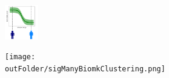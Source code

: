 \documentclass[8pt,xcolor=table]{beamer}
\begin{document}
\begin{frame}
\begin{columns}[T]
\begin{column}{.3\textwidth}
    \begin{figure}
    \centering
    \includegraphics[height=1.5cm, trim=120 0 120 0]{Disease_progression_one_sigmoid_confidence.png}
    \end{figure}
    
    \begin{figure}
    \centering
    \texttt{[image: \\outFolder/sigManyBiomkClustering.png]}
    \end{figure}

    \end{column}
  \end{columns}
  
  \vspace{6em}
  
% 
%   


\end{frame}


\end{document}
